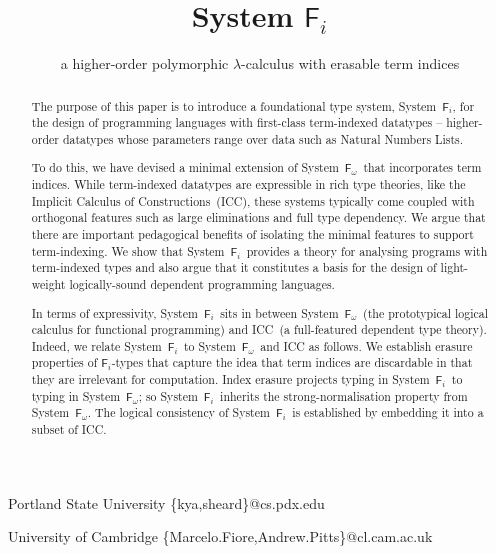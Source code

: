\documentclass[preprint]{sigplanconf}
\newcommand{\Fi}{\ensuremath{\mathsf{F}_i}}
\newcommand{\Fw}{\ensuremath{\mathsf{F}_\omega}}
\theoremstyle{plain}
\theoremstyle{remark}
\theoremstyle{definition}
\begin{document}
\copyrightdata{[to be supplied]} 


\title{System \Fi}
\subtitle{a higher-order polymorphic $\lambda$-calculus with erasable term indices}

           {Portland State University}
	   {\{kya,sheard\}@cs.pdx.edu}

           {University of Cambridge}
	   {\{Marcelo.Fiore,Andrew.Pitts\}@cl.cam.ac.uk}

\maketitle

\begin{abstract}
The purpose of this paper is to introduce a foundational type system,
System~\Fi, for the design of programming languages with first-class
term-indexed datatypes -- higher-order datatypes whose parameters range
over data such as 
Natural Numbers %
Lists. %

To do this, we have
devised a minimal extension of System~\Fw\ that incorporates term indices.
While term-indexed datatypes are expressible in rich type theories, like
the Implicit Calculus of Constructions~(ICC), these systems typically come 
coupled with
orthogonal features such as large eliminations and full type dependency.  We
argue that there are important pedagogical benefits of isolating the
minimal features to support term-indexing. We show that System~\Fi\
provides a theory for analysing programs with term-indexed types and also
argue that it constitutes a basis for the design of light-weight
logically-sound dependent programming languages.

In terms of expressivity, System~\Fi\ sits in between System~\Fw\ (the
prototypical logical calculus for functional programming) and ICC~(a
full-featured dependent type theory).  Indeed, we relate System~\Fi\ to
System~\Fw\ and ICC as follows.  We establish erasure properties of
\Fi-types that capture the idea that term indices are discardable in
that they are irrelevant for computation.  Index erasure projects typing
in System~\Fi\ to typing in System~\Fw; so System~\Fi\ inherits the
strong-normalisation property from System~\Fw.  The logical consistency of
System~\Fi\ is established by embedding it into a subset of ICC.
\end{abstract}
\end{document}
